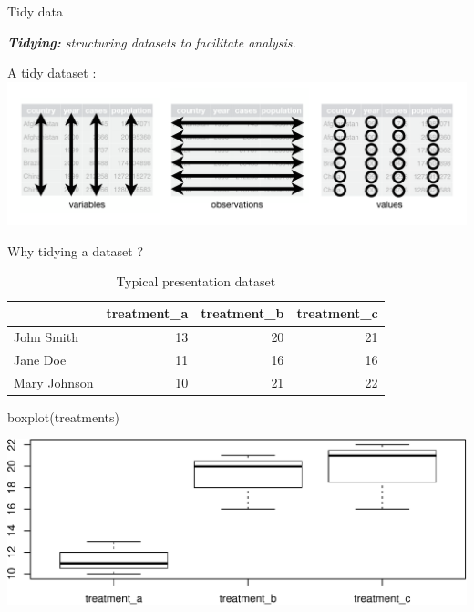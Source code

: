 \documentclass[14pt,ignorenonframetext,]{bredelebeamer}
\newenvironment{Shaded}{\begin{snugshade}}{\end{snugshade}}
\newcommand{\KeywordTok}[1]{\textcolor[rgb]{0.94,0.87,0.69}{#1}}
\newcommand{\NormalTok}[1]{\textcolor[rgb]{0.80,0.80,0.80}{#1}}
\begin{document}
\begin{frame}{Tidy data}

\begin{Large}
\textit{\textbf{Tidying:} structuring datasets to facilitate analysis.}
\end{Large}\begin{center}
A tidy dataset :\\
\includegraphics{images/tidy-1.png}

\end{center}

\end{frame}

\begin{frame}[fragile]{Why tidying a dataset ?}

\begin{center}
\begin{table}[t]

\caption{\label{tab:show1}Typical presentation dataset}
\centering
\begin{tabular}{l|r|r|r}
\hline
  & treatment\_a & treatment\_b & treatment\_c\\
\hline
John Smith & 13 & 20 & 21\\
\hline
Jane Doe & 11 & 16 & 16\\
\hline
Mary Johnson & 10 & 21 & 22\\
\hline
\end{tabular}
\end{table}
\end{center}

\begin{Shaded}
\begin{Highlighting}[]
\KeywordTok{boxplot}\NormalTok{(treatments)}
\end{Highlighting}
\end{Shaded}

\includegraphics{tidyverse_28_03_files/figure-beamer/boxplot1-1.pdf}

\end{frame}
\end{document}
